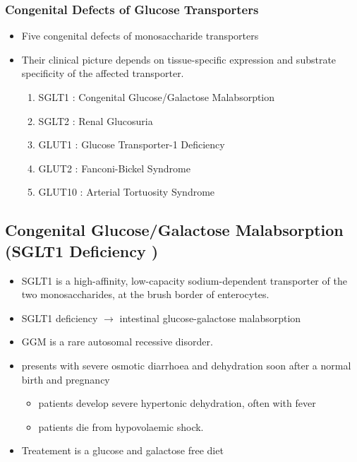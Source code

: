\documentclass{scrartcl}
\begin{document}
\subsubsection{Congenital Defects of Glucose Transporters}
\label{sec:org61fcc9f}
\begin{itemize}
\item Five congenital defects of monosaccharide transporters
\item Their clinical picture depends on tissue-specific expression and
substrate specificity of the affected transporter.

\begin{enumerate}
\item SGLT1 : Congenital Glucose/Galactose Malabsorption
\item SGLT2 : Renal Glucosuria
\item GLUT1 : Glucose Transporter-1 Deficiency
\item GLUT2 : Fanconi-Bickel Syndrome
\item GLUT10 : Arterial Tortuosity Syndrome
\end{enumerate}
\end{itemize}

\subsection{Congenital Glucose/Galactose Malabsorption (SGLT1 Deficiency )}
\label{sec:orgd1ac6e1}

\begin{itemize}
\item SGLT1 is a high-affinity, low-capacity sodium-dependent transporter
of the two monosaccharides, at the brush border of enterocytes.

\item SGLT1 deficiency \(\to\) intestinal glucose-galactose malabsorption
\item GGM is a rare autosomal recessive disorder.

\item presents with severe osmotic diarrhoea and dehydration soon after a
normal birth and pregnancy
\begin{itemize}
\item patients develop severe hypertonic dehydration, often with fever
\item patients die from hypovolaemic shock.
\end{itemize}

\item Treatement is a glucose and galactose free diet
\end{itemize}
\end{document}
